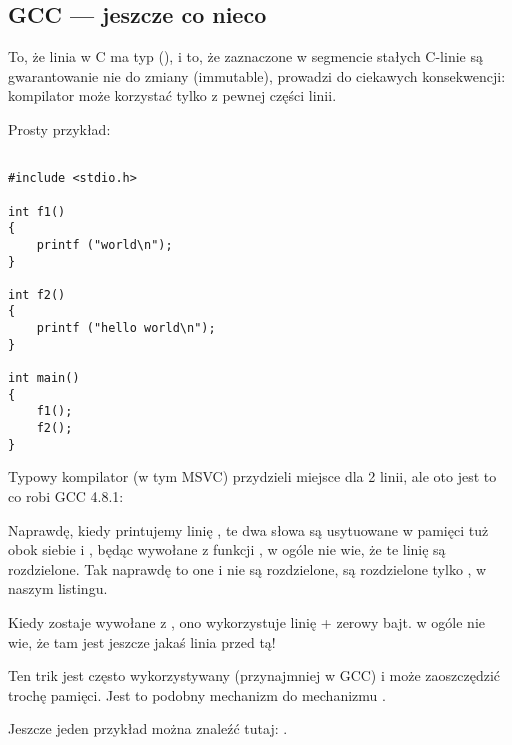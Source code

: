 \subsection{GCC --- jeszcze co nieco}
\label{use_parts_of_C_strings}

To, że  linia w C ma typ  (), 
i to, że zaznaczone w segmencie stałych C-linie są gwarantowanie nie do zmiany (immutable), 
prowadzi do ciekawych konsekwencji: kompilator może korzystać tylko z pewnej części linii.

Prosty przykład:

\begin{lstlisting}[style=customc]

#include <stdio.h>

int f1()
{
	printf ("world\n");
}

int f2()
{
	printf ("hello world\n");
}

int main()
{
	f1();
	f2();
}
\end{lstlisting}

Typowy kompilator \CCpp (w tym MSVC) przydzieli miejsce dla 2 linii, ale oto jest to co robi GCC 4.8.1:



Naprawdę, kiedy printujemy linię , 
te dwa słowa są usytuowane w pamięci tuż obok siebie i \puts, będąc wywołane z funkcji , w ogóle nie wie,
że te linię są rozdzielone. Tak naprawdę to one i nie są rozdzielone, są rozdzielone 
tylko , w naszym listingu.

Kiedy \puts zostaje wywołane z , ono wykorzystuje linię  + zerowy bajt. \puts w ogóle nie wie, że tam jest jeszcze jakaś linia przed tą!

Ten trik jest często wykorzystywany (przynajmniej w GCC) i może zaoszczędzić trochę pamięci.
Jest to podobny mechanizm do mechanizmu .

Jeszcze jeden przykład można znaleźć tutaj: .



